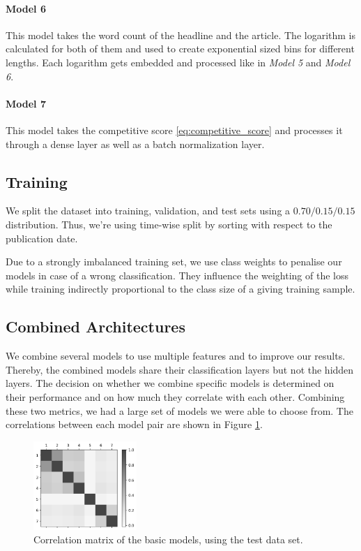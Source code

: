 \paragraph{Model 6} 
This model takes the word count of the headline and the article. The logarithm is calculated for both of them and used to create exponential sized bins for different lengths. Each logarithm gets embedded and processed like in \textit{Model 5} and \textit{Model 6}.

\paragraph{Model 7} 
This model takes the competitive score \ref{eq:competitive_score} and processes it through a dense layer as well as a batch normalization layer.

\subsection{Training}
We split the dataset into training, validation, and test sets using a $0.70/0.15/0.15$ distribution. Thus, we're using time-wise split by sorting with respect to the publication date.

Due to a strongly imbalanced training set, we use class weights to penalise our models in case of a wrong classification. They influence the weighting of the loss while training indirectly proportional to the class size of a giving training sample.

\subsection{Combined Architectures}
We combine several models to use multiple features and to improve our results. Thereby, the combined models share their classification layers but not the hidden layers.
The decision on whether we combine specific models is determined on their performance and on how much they correlate with each other. Combining these two metrics, we had a large set of models we were able to choose from. The correlations between each model pair are shown in Figure \ref{fig:correlation_matrix}. 

\begin{figure}
	\includegraphics[width=0.35\textwidth]{fig/correlations_bw.png}
	\caption{\textmd{Correlation matrix of the basic models, using the test data set.}}
	\label{fig:correlation_matrix}
\end{figure}